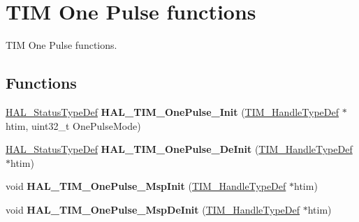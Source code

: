 \hypertarget{group___t_i_m___exported___functions___group5}{}\section{T\+IM One Pulse functions}
\label{group___t_i_m___exported___functions___group5}


T\+IM One Pulse functions.  


\subsection*{Functions}
\begin{DoxyCompactItemize}
\item 
\mbox{\label{group___t_i_m___exported___functions___group5_ga476d67a220c23ebdc69fac7b09dbaa72}} 
\hyperlink{stm32f4xx__hal__def_8h_a63c0679d1cb8b8c684fbb0632743478f}{H\+A\+L\+\_\+\+Status\+Type\+Def} {\bfseries H\+A\+L\+\_\+\+T\+I\+M\+\_\+\+One\+Pulse\+\_\+\+Init} (\hyperlink{struct_t_i_m___handle_type_def}{T\+I\+M\+\_\+\+Handle\+Type\+Def} $\ast$htim, uint32\+\_\+t One\+Pulse\+Mode)
\item 
\mbox{\label{group___t_i_m___exported___functions___group5_gae60b468b11199522c6c83a943439c7b7}} 
\hyperlink{stm32f4xx__hal__def_8h_a63c0679d1cb8b8c684fbb0632743478f}{H\+A\+L\+\_\+\+Status\+Type\+Def} {\bfseries H\+A\+L\+\_\+\+T\+I\+M\+\_\+\+One\+Pulse\+\_\+\+De\+Init} (\hyperlink{struct_t_i_m___handle_type_def}{T\+I\+M\+\_\+\+Handle\+Type\+Def} $\ast$htim)
\item 
\mbox{\label{group___t_i_m___exported___functions___group5_ga6579726753cb2b769a21d10bec75219f}} 
void {\bfseries H\+A\+L\+\_\+\+T\+I\+M\+\_\+\+One\+Pulse\+\_\+\+Msp\+Init} (\hyperlink{struct_t_i_m___handle_type_def}{T\+I\+M\+\_\+\+Handle\+Type\+Def} $\ast$htim)
\item 
\mbox{\label{group___t_i_m___exported___functions___group5_ga9b73c7135e8348613f30f3a4d84478e7}} 
void {\bfseries H\+A\+L\+\_\+\+T\+I\+M\+\_\+\+One\+Pulse\+\_\+\+Msp\+De\+Init} (\hyperlink{struct_t_i_m___handle_type_def}{T\+I\+M\+\_\+\+Handle\+Type\+Def} $\ast$htim)
\item 

\end{DoxyCompactItemize}
